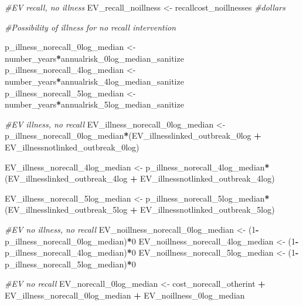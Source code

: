 \documentclass[
]{article}
\newenvironment{Shaded}{\begin{snugshade}}{\end{snugshade}}
\newcommand{\CommentTok}[1]{\textcolor[rgb]{0.56,0.35,0.01}{\textit{#1}}}
\newcommand{\DecValTok}[1]{\textcolor[rgb]{0.00,0.00,0.81}{#1}}
\newcommand{\NormalTok}[1]{#1}
\newcommand{\OtherTok}[1]{\textcolor[rgb]{0.56,0.35,0.01}{#1}}
\newcommand{\SpecialCharTok}[1]{\textcolor[rgb]{0.81,0.36,0.00}{\textbf{#1}}}
\begin{document}
\begin{Shaded}
\begin{Highlighting}[]
\CommentTok{\#EV recall, no illness}
\NormalTok{EV\_recall\_noillness }\OtherTok{\textless{}{-}}\NormalTok{ recallcost\_noillnesses }\CommentTok{\#dollars}


\CommentTok{\#Possibility of illness for no recall intervention}

\NormalTok{p\_illness\_norecall\_0log\_median }\OtherTok{\textless{}{-}}\NormalTok{ number\_years}\SpecialCharTok{*}\NormalTok{annualrisk\_0log\_median\_sanitize }
\NormalTok{p\_illness\_norecall\_4log\_median }\OtherTok{\textless{}{-}}\NormalTok{ number\_years}\SpecialCharTok{*}\NormalTok{annualrisk\_4log\_median\_sanitize}
\NormalTok{p\_illness\_norecall\_5log\_median }\OtherTok{\textless{}{-}}\NormalTok{ number\_years}\SpecialCharTok{*}\NormalTok{annualrisk\_5log\_median\_sanitize}


\CommentTok{\#EV illness, no recall}
\NormalTok{EV\_illness\_norecall\_0log\_median }\OtherTok{\textless{}{-}}\NormalTok{ p\_illness\_norecall\_0log\_median}\SpecialCharTok{*}\NormalTok{(EV\_illnesslinked\_outbreak\_0log }\SpecialCharTok{+}\NormalTok{ EV\_illnessnotlinked\_outbreak\_0log)}

\NormalTok{EV\_illness\_norecall\_4log\_median }\OtherTok{\textless{}{-}}\NormalTok{ p\_illness\_norecall\_4log\_median}\SpecialCharTok{*}\NormalTok{(EV\_illnesslinked\_outbreak\_4log }\SpecialCharTok{+}\NormalTok{ EV\_illnessnotlinked\_outbreak\_4log)}

\NormalTok{EV\_illness\_norecall\_5log\_median }\OtherTok{\textless{}{-}}\NormalTok{ p\_illness\_norecall\_5log\_median}\SpecialCharTok{*}\NormalTok{(EV\_illnesslinked\_outbreak\_5log }\SpecialCharTok{+}\NormalTok{ EV\_illnessnotlinked\_outbreak\_5log)}


\CommentTok{\#EV no illness, no recall}
\NormalTok{EV\_noillness\_norecall\_0log\_median }\OtherTok{\textless{}{-}}\NormalTok{ (}\DecValTok{1}\SpecialCharTok{{-}}\NormalTok{ p\_illness\_norecall\_0log\_median)}\SpecialCharTok{*}\DecValTok{0}
\NormalTok{EV\_noillness\_norecall\_4log\_median }\OtherTok{\textless{}{-}}\NormalTok{ (}\DecValTok{1}\SpecialCharTok{{-}}\NormalTok{ p\_illness\_norecall\_4log\_median)}\SpecialCharTok{*}\DecValTok{0}
\NormalTok{EV\_noillness\_norecall\_5log\_median }\OtherTok{\textless{}{-}}\NormalTok{ (}\DecValTok{1}\SpecialCharTok{{-}}\NormalTok{ p\_illness\_norecall\_5log\_median)}\SpecialCharTok{*}\DecValTok{0}


\CommentTok{\#EV no recall}
\NormalTok{EV\_norecall\_0log\_median }\OtherTok{\textless{}{-}}\NormalTok{ cost\_norecall\_otherint }\SpecialCharTok{+}\NormalTok{ EV\_illness\_norecall\_0log\_median }\SpecialCharTok{+}\NormalTok{ EV\_noillness\_0log\_median}


\end{Highlighting}
\end{Shaded}
\end{document}
